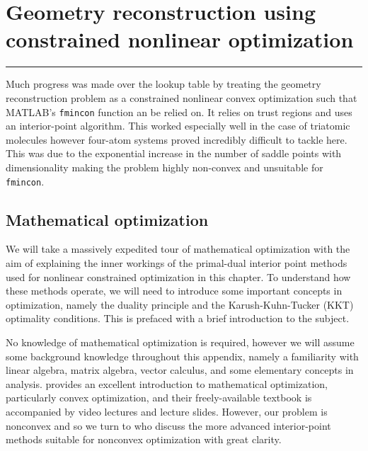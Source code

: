 \chapter{Geometry reconstruction using constrained nonlinear optimization}\label{ch:optimization}

\vspace{-1.5 em}
\begin{addmargin}[-0.5cm]{0cm}
  \minitoc
\end{addmargin}
\hrule
\vspace{1.5 em}

Much progress was made over the lookup table by treating the geometry reconstruction problem as a constrained nonlinear convex optimization such that MATLAB's \texttt{fmincon} function an be relied on. It relies on trust regions and uses an interior-point algorithm. This worked especially well in the case of triatomic molecules however four-atom systems proved incredibly difficult to tackle here. This was due to the exponential increase in the number of saddle points with dimensionality \footnotemark making the problem highly non-convex and unsuitable for \texttt{fmincon}.


\section{Mathematical optimization}

We will take a massively expedited tour of mathematical optimization with the aim of explaining the inner workings of the primal-dual interior point methods used for nonlinear constrained optimization in this chapter. To understand how these methods operate, we will need to introduce some important concepts in optimization, namely the duality principle and the Karush-Kuhn-Tucker (KKT) optimality conditions. This is prefaced with a brief introduction to the subject.

No knowledge of mathematical optimization is required, however we will assume some background knowledge throughout this appendix, namely a familiarity with linear algebra, matrix algebra, vector calculus, and some elementary concepts in analysis. \citet{Boyd04} provides an excellent introduction to mathematical optimization, particularly convex optimization, and their freely-available textbook is accompanied by video lectures and lecture slides. However, our problem is nonconvex and so we turn to \citet{Nocedal06} who discuss the more advanced interior-point methods suitable for nonconvex optimization with great clarity.

